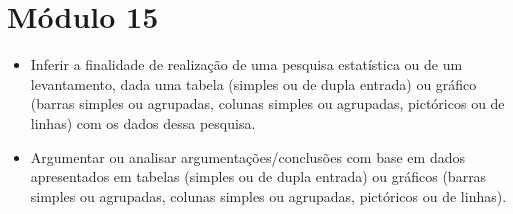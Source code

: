 {


\chapter{Módulo 15}


\begin{itemize}
\item Inferir a finalidade de realização de uma pesquisa estatística ou de
um levantamento, dada uma tabela (simples ou de dupla entrada) ou
gráfico (barras simples ou agrupadas, colunas simples ou agrupadas,
pictóricos ou de linhas) com os dados dessa pesquisa.

\item Argumentar ou analisar argumentações/conclusões com base em dados
apresentados em tabelas (simples ou de dupla entrada) ou gráficos
(barras simples ou agrupadas, colunas simples ou agrupadas, pictóricos
ou de linhas).
\end{itemize}

}
